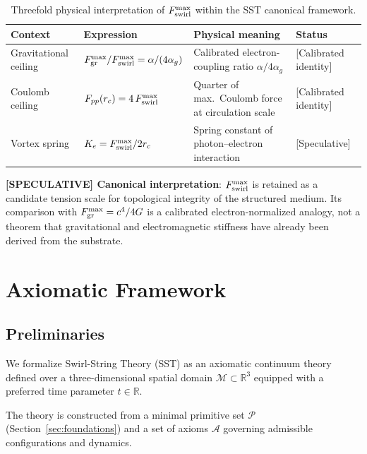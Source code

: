 \documentclass[11pt]{article}
\theoremstyle{definition}
\theoremstyle{plain}
\theoremstyle{remark}
\newcommand{\rc}{{r_c}}
\begin{document}
        \begin{table}[h]
        \centering
        \caption{Threefold physical interpretation of $F_{\rm swirl}^{\max}$ within the SST canonical framework.}
        \label{tab:Fmax_triple}
        \begin{tabular}{p{3.2cm}p{5.0cm}p{4.8cm}l}
        \hline
        \textbf{Context} & \textbf{Expression} & \textbf{Physical meaning} & \textbf{Status} \\
        \hline
        Gravitational ceiling &
          $F_{\rm gr}^{\max}/F_{\rm swirl}^{\max} = \alpha/(4\alpha_g)$ &
          Calibrated electron-coupling ratio $\alpha/4\alpha_g$ &
          {[Calibrated identity]} \\[6pt]
        Coulomb ceiling &
          $F_{pp}(\rc) = 4\,F_{\rm swirl}^{\max}$ &
          Quarter of max.\ Coulomb force at circulation scale &
          {[Calibrated identity]} \\[6pt]
        Vortex spring &
          $K_e = F_{\rm swirl}^{\max}/2\rc$ &
          Spring constant of photon--electron interaction &
          {[Speculative]} \\
        \hline
        \end{tabular}
        \end{table}

        \textbf{[SPECULATIVE] Canonical interpretation}: $F_{\rm swirl}^{\max}$ is retained as a candidate tension scale for topological integrity of the structured medium. Its comparison with $F_{\rm gr}^{\max}=c^4/4G$ is a calibrated electron-normalized analogy, not a theorem that gravitational and electromagnetic stiffness have already been derived from the substrate.

\section{Axiomatic Framework}
    \label{sec:axioms}
    
    \subsection{Preliminaries}
        
        We formalize Swirl-String Theory (SST) as an axiomatic continuum theory defined over a three-dimensional spatial domain $\mathcal{M} \subset \mathbb{R}^3$ equipped with a preferred time parameter $t \in \mathbb{R}$.
        
        The theory is constructed from a minimal primitive set $\mathcal{P}$ (Section~\ref{sec:foundations}) and a set of axioms $\mathcal{A}$ governing admissible configurations and dynamics.
    
\end{document}
